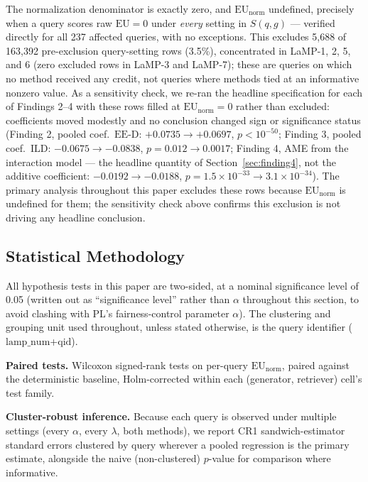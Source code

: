 \documentclass[11pt]{article}
\newcommand{\eed}{\ensuremath{\mathrm{EE\text{-}D}}}
\newcommand{\eu}{\ensuremath{\mathrm{EU}}}
\newcommand{\eunorm}{\ensuremath{\mathrm{EU}_{\mathrm{norm}}}}
\newcommand{\ild}{\ensuremath{\mathrm{ILD}}}
\begin{document}
The normalization denominator is exactly zero, and \eunorm{} undefined,
precisely when a query scores raw \eu{}$=0$ under \emph{every} setting in
$S(q,g)$ --- verified directly for all 237 affected queries, with no
exceptions. This excludes 5{,}688 of 163{,}392 pre-exclusion query-setting
rows (3.5\%), concentrated in LaMP-1, 2, 5, and 6 (zero excluded rows in
LaMP-3 and LaMP-7); these are queries on which no method received any
credit, not queries where methods tied at an informative nonzero value. As
a sensitivity check, we re-ran the headline specification for each of
Findings 2--4 with these rows filled at \eunorm{}$=0$ rather than
excluded: coefficients moved modestly and no conclusion changed sign or
significance status (Finding 2, pooled coef.\ \eed{}:
$+0.0735 \to +0.0697$, $p<10^{-50}$; Finding 3, pooled coef.\ \ild{}:
$-0.0675 \to -0.0838$, $p=0.012 \to 0.0017$; Finding 4, AME from the
interaction model --- the headline quantity of
Section~\ref{sec:finding4}, not the additive coefficient:
$-0.0192 \to -0.0188$, $p=1.5\times10^{-33} \to 3.1\times10^{-34}$). The
primary analysis throughout this paper excludes these rows because
\eunorm{} is undefined for them; the sensitivity check above confirms this
exclusion is not driving any headline conclusion.

\subsection{Statistical Methodology}
\label{sec:stats-methodology}

All hypothesis tests in this paper are two-sided, at a nominal
significance level of 0.05 (written out as ``significance level'' rather
than $\alpha$ throughout this section, to avoid clashing with PL's
fairness-control parameter $\alpha$). The clustering and grouping unit
used throughout, unless stated otherwise, is the query identifier
($\mathrm{lamp\_num}$+$\mathrm{qid}$).

\textbf{Paired tests.} Wilcoxon signed-rank tests on per-query \eunorm{},
paired against the deterministic baseline, Holm-corrected within each
(generator, retriever) cell's test family.

\textbf{Cluster-robust inference.} Because each query is observed under
multiple settings (every $\alpha$, every $\lambda$, both methods), we
report CR1 sandwich-estimator standard errors clustered by query wherever
a pooled regression is the primary estimate, alongside the naive
(non-clustered) $p$-value for comparison where informative.
\end{document}
